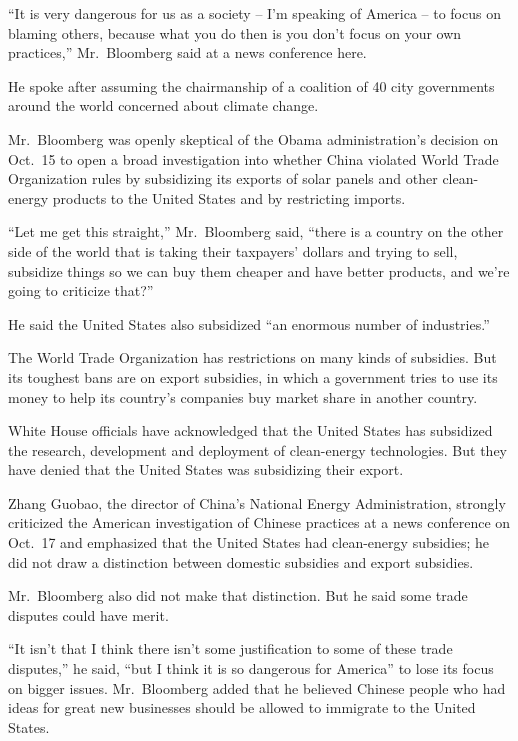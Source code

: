 ﻿\documentclass[12pt]{article}
\begin{document}
``It is very dangerous for us as a society -- I'm speaking of America -- to focus on blaming others,
because what you do then is you don't focus on your own practices,'' Mr.~Bloomberg said at a news
conference here.

He spoke after assuming the chairmanship of a coalition of 40 city governments around the world
concerned about climate change.

Mr.~Bloomberg was openly skeptical of the Obama administration's decision on Oct.~15 to open a broad
investigation into whether China violated World Trade Organization rules by subsidizing its exports
of solar panels and other clean-energy products to the United States and by restricting imports.

``Let me get this straight,'' Mr.~Bloomberg said, ``there is a country on the other side of the
world that is taking their taxpayers' dollars and trying to sell, subsidize things so we can buy
them cheaper and have better products, and we're going to criticize that?''

He said the United States also subsidized ``an enormous number of industries.''

The World Trade Organization has restrictions on many kinds of subsidies. But its toughest bans are
on export subsidies, in which a government tries to use its money to help its country's companies
buy market share in another country.

White House officials have acknowledged that the United States has subsidized the research,
development and deployment of clean-energy technologies. But they have denied that the United States
was subsidizing their export.

Zhang Guobao, the director of China's National Energy Administration, strongly criticized the
American investigation of Chinese practices at a news conference on Oct.~17 and emphasized that the
United States had clean-energy subsidies; he did not draw a distinction between domestic subsidies
and export subsidies.

Mr.~Bloomberg also did not make that distinction. But he said some trade disputes could have merit.

``It isn't that I think there isn't some justification to some of these trade disputes,'' he said,
``but I think it is so dangerous for America'' to lose its focus on bigger issues. Mr.~Bloomberg
added that he believed Chinese people who had ideas for great new businesses should be allowed to
immigrate to the United States.
\end{document}
